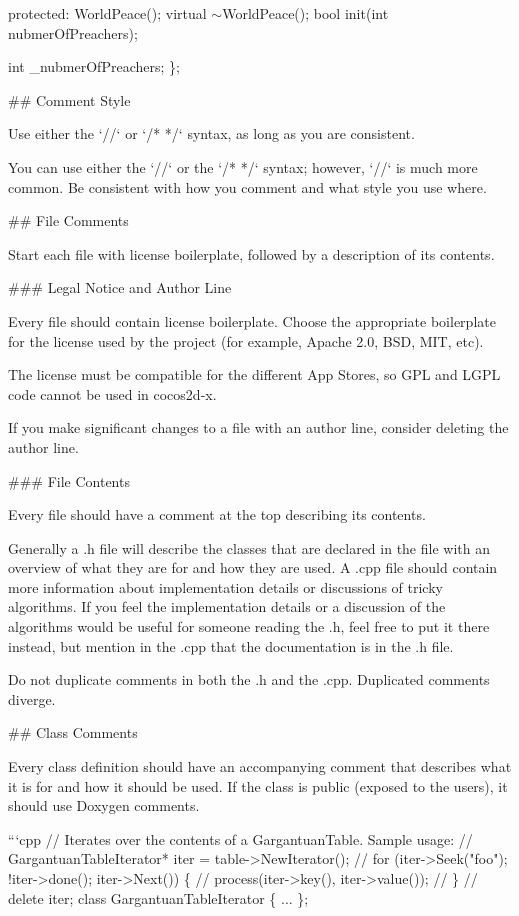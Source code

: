 protected\+: World\+Peace(); virtual $\sim$\+World\+Peace(); bool init(int nubmer\+Of\+Preachers);

int \+\_\+nubmer\+Of\+Preachers; \}; 
\begin{DoxyCode}
## Comment Style

Use either the `//` or `/* */` syntax, as long as you are consistent.

You can use either the `//` or the `/* */` syntax; however, `//` is much more common. Be consistent with
       how you comment and what style you use where.

## File Comments

Start each file with license boilerplate, followed by a description of its contents.

### Legal Notice and Author Line

Every file should contain license boilerplate. Choose the appropriate boilerplate for the license used by
       the project (for example, Apache 2.0, BSD, MIT, etc).

The license must be compatible for the different App Stores, so GPL and LGPL code cannot be used in
       cocos2d-x.

If you make significant changes to a file with an author line, consider deleting the author line.

### File Contents

Every file should have a comment at the top describing its contents.

Generally a .h file will describe the classes that are declared in the file with an overview of what they
       are for and how they are used. A .cpp file should contain more information about implementation details or
       discussions of tricky algorithms. If you feel the implementation details or a discussion of the algorithms
       would be useful for someone reading the .h, feel free to put it there instead, but mention in the .cpp that the
       documentation is in the .h file.

Do not duplicate comments in both the .h and the .cpp. Duplicated comments diverge.

## Class Comments

Every class definition should have an accompanying comment that describes what it is for and how it should
       be used. If the class is public (exposed to the users), it should use Doxygen comments.

```cpp
// Iterates over the contents of a GargantuanTable.  Sample usage:
//    GargantuanTableIterator* iter = table->NewIterator();
//    for (iter->Seek("foo"); !iter->done(); iter->Next()) \{
//      process(iter->key(), iter->value());
//    \}
//    delete iter;
class GargantuanTableIterator \{
  ...
\};
\end{DoxyCode}


